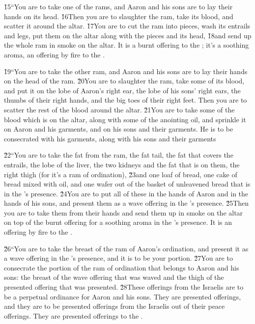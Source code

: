 \v{15}``You are to take one of the rams, and Aaron and his sons are to lay their hands on its head. \v{16}Then you are to slaughter the ram, take its blood, and scatter it around the altar. \v{17}You are to cut the ram into pieces, wash its entrails and legs, put them on the altar along with the pieces and its head, \v{18}and send up the whole ram in smoke on the altar. It is a burnt offering to the ; it's a soothing aroma, an offering by fire to the .

\v{19}``You are to take the other ram, and Aaron and his sons are to lay their hands on the head of the ram. \v{20}You are to slaughter the ram, take some of its blood, and put it on the lobe of Aaron's right ear, the lobe of his sons' right ears, the thumbs of their right hands, and the big toes of their right feet. Then you are to scatter the rest of the blood around the altar. \v{21}You are to take some of the blood which is on the altar, along with some of the anointing oil, and sprinkle it on Aaron and his garments, and on his sons and their garments. He is to be consecrated with his garments, along with his sons and their garments

\v{22}``You are to take the fat from the ram, the fat tail, the fat that covers the entrails, the lobe of the liver, the two kidneys and the fat that is on them, the right thigh (for it's a ram of ordination), \v{23}and one loaf of bread, one cake of bread mixed with oil, and one wafer out of the basket of unleavened bread that is in the 's presence. \v{24}You are to put all of these in the hands of Aaron and in the hands of his sons, and present them as a wave offering in the 's presence. \v{25}Then you are to take them from their hands and send them up in smoke on the altar on top of the burnt offering for a soothing aroma in the 's presence. It is an offering by fire to the .

\v{26}``You are to take the breast of the ram of Aaron's ordination, and present it as a wave offering in the 's presence, and it is to be your portion. \v{27}You are to consecrate the portion of the ram of ordination that belongs to Aaron and his sons: the breast of the wave offering that was waved and the thigh of the presented offering that was presented. \v{28}These offerings from the Israelis are to be a perpetual ordinance for Aaron and his sons. They are presented offerings, and they are to be presented offerings from the Israelis out of their peace offerings. They are presented offerings to the .

